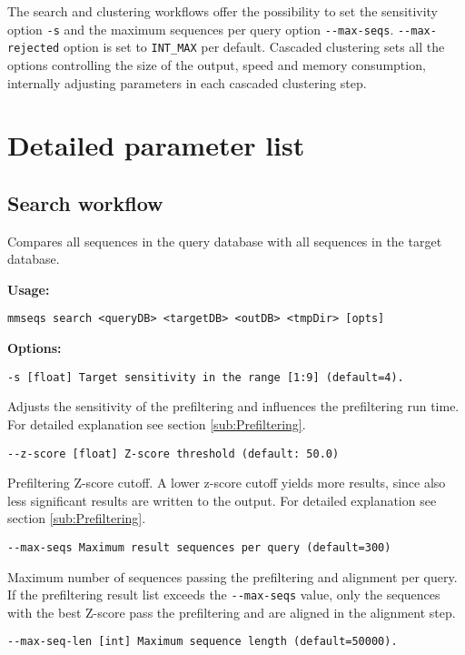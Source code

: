 \documentclass[11pt,a4paper]{report}
\begin{document}
The search and clustering workflows offer the possibility to set the
sensitivity option \texttt{-s} and the maximum sequences per query
option \texttt{-{}-max-seqs}. \texttt{-{}-max-rejected} option is
set to \texttt{INT\_MAX} per default. Cascaded clustering sets all
the options controlling the size of the output, speed and memory consumption,
internally adjusting parameters in each cascaded clustering step.


\section{Detailed parameter list\label{sec:Detailed-parameter-list}}


\subsection{Search workflow\label{sub:Search-workflow}}

Compares all sequences in the query database with all sequences in
the target database. 

\textbf{Usage:}

\texttt{mmseqs search <queryDB> <targetDB> <outDB> <tmpDir> {[}opts{]}}

\textbf{Options:}

\texttt{\small -s {[}float{]} Target sensitivity in the range {[}1:9{]}
(default=4).}{\small \par}

Adjusts the sensitivity of the prefiltering and influences the prefiltering
run time. For detailed explanation see section \ref{sub:Prefiltering}.

\texttt{\small -{}-z-score {[}float{]} Z-score threshold (default: 50.0)}{\small \par}

Prefiltering Z-score cutoff. A lower z-score cutoff yields more results,
since also less significant results are written to the output. For
detailed explanation see section \ref{sub:Prefiltering}.

\texttt{\small -{}-max-seqs Maximum result sequences per query (default=300)}{\small \par}

Maximum number of sequences passing the prefiltering and alignment
per query. If the prefiltering result list exceeds the \texttt{-{}-max-seqs}
value, only the sequences with the best Z-score pass the prefiltering
and are aligned in the alignment step.

\texttt{\small -{}-max-seq-len {[}int{]} Maximum sequence length (default=50000).}{\small \par}
\end{document}
